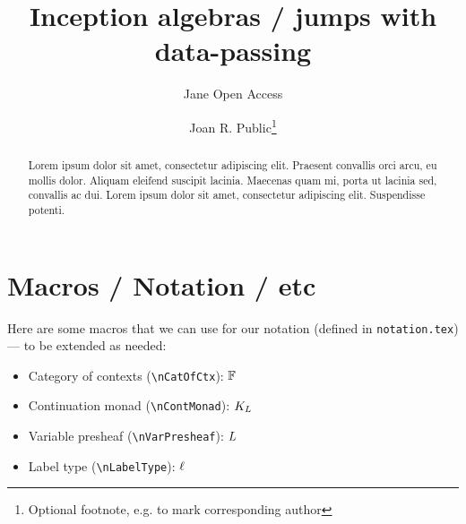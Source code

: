 \documentclass[a4paper,UKenglish,cleveref,thm-restate]{lipics-v2021}
\title{Inception algebras / jumps with data-passing} %
\author{Jane {Open Access}}{Dummy University Computing Laboratory, [optional: Address], Country \and My second affiliation, Country \and \url{http://www.myhomepage.edu} }{johnqpublic@dummyuni.org}{https://orcid.org/0000-0002-1825-0097}{(Optional) author-specific funding acknowledgements}%
\author{Joan R. Public\footnote{Optional footnote, e.g. to mark corresponding author}}{Department of Informatics, Dummy College, [optional: Address], Country}{joanrpublic@dummycollege.org}{[orcid]}{[funding]}
\begin{document}
\maketitle

\begin{abstract}
Lorem ipsum dolor sit amet, consectetur adipiscing elit. Praesent convallis orci arcu, eu mollis dolor. Aliquam eleifend suscipit lacinia. Maecenas quam mi, porta ut lacinia sed, convallis ac dui. Lorem ipsum dolor sit amet, consectetur adipiscing elit. Suspendisse potenti. 
\end{abstract}

\section{Macros / Notation / etc}
Here are some macros that we can use for our notation (defined in \verb+notation.tex+) --- to be extended as needed:

\begin{itemize}
\item Category of contexts (\verb+\nCatOfCtx+): $\mathbb{F}$
\item Continuation monad (\verb+\nContMonad+): $K_L$
\item Variable presheaf (\verb+\nVarPresheaf+): $L$
\item Label type (\verb+\nLabelType+): $\ell$
\end{itemize}
\end{document}
